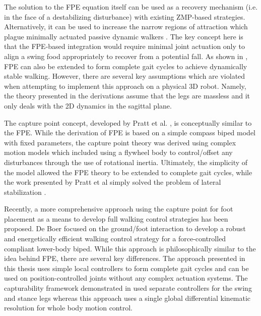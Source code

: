 The solution to the FPE equation itself can be used as a recovery mechanism (i.e. in the face of a destabilizing disturbance) with existing ZMP-based strategies. Alternatively, it can be used to increase the narrow regions of attraction which plague minimally actuated passive dynamic walkers \cite{Goswami:1996gn,Asano:2000wi,Kuo:1999tn}. The key concept here is that the FPE-based integration would require minimal joint actuation only to align a swing food appropriately to recover from a potential fall. As shown in \cite{Wight:2008ii,Wight:2008vt}, FPE can also be extended to form complete gait cycles to achieve dynamically stable walking. However, there are several key assumptions which are violated when attempting to implement this approach on a physical 3D robot. Namely, the theory presented in the derivations assume that the legs are massless and it only deals with the 2D dynamics in the sagittal plane.

The capture point concept, developed by Pratt et al. \cite{Pratt:2006vy}, is conceptually similar to the FPE. While the derivation of FPE is based on a simple compass biped model with fixed parameters, the capture point theory was derived using complex motion models which included using a flywheel body to control/offset any disturbances through the use of rotational inertia. Ultimately, the simplicity of the model allowed the FPE theory to be extended to complete gait cycles, while the work presented by Pratt et al simply solved the problem of lateral stabilization \cite{Wight:2008ii}.

Recently, a more comprehensive approach using the capture point for foot placement as a means to develop full walking control strategies has been proposed. De Boer \cite{DeBoer:2012wp} focused on the ground/foot interaction to develop a robust and energetically efficient walking control strategy for a force-controlled compliant lower-body biped. While this approach is philosophically similar to the idea behind FPE, there are several key differences. The approach presented in this thesis uses simple local controllers to form complete gait cycles and can be used on position-controlled joints without any complex actuation systems. The capturability framework demonstrated in \cite{Pratt01092012} used separate controllers for the swing and stance legs whereas this approach uses a single global differential kinematic resolution for whole body motion control.





